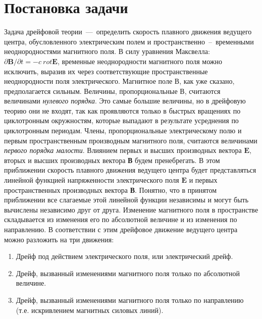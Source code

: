 \section{Постановка задачи}
Задача дрейфовой теории~---~определить скорость плавного движения ведущего центра, обусловленного электрическим полем и пространственно~--~временными неоднородностями магнитного поля. В силу 
уравнения Максвелла: $ \partial\textbf{B}/\partial t = -c ~rot \textbf{E}$, временные неоднородности магнитного поля можно исключить, выразив их через соответствующие пространственные неоднородности поля электрического. Магнитное поле $\textbf{В}$, как уже сказано, предполагается сильным. Величины, пропорциональные $\textbf{В}$, считаются величинами \textit{нулевого порядка}. Это самые большие величины, но в дрейфовую теорию они не входят, так как проявляются только в быстрых вращениях по циклотронным окружностям, которые выпадают в результате усреднения по циклотронным периодам. Члены, пропорциональные электрическому полю и первым пространственным производным магнитного поля, считаются величинами \textit{первого порядка малости}. Влиянием первых и высших производных вектора $\textbf{E}$, вторых и высших производных вектора \textbf{В} будем пренебрегать. В этом приближении скорость плавного движения ведущего центра будет представляться линейной функцией напряженности электрического поля $\textbf{E}$ и первых пространственных производных вектора \textbf{В}. Понятно, что в принятом приближении все слагаемые этой линейной функции независимы и могут быть вычислены независимо друг от друга. Изменение магнитного поля в пространстве складывается из изменения его по абсолютной величине и из изменения по направлению. В соответствии с этим дрейфовое движение ведущего центра можно разложить на три движения:

\begin{enumerate}
    \item Дрейф под действием электрического поля, или электрический дрейф.
    \item Дрейф, вызванный изменениями магнитного поля только по абсолютной величине.
    \item Дрейф, вызванный изменениями магнитного поля только по направлению (т.е. искривлением магнитных силовых линий).
\end{enumerate}
